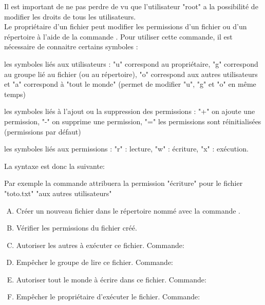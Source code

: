 Il est important de ne pas perdre de vu que l'utilisateur "root" a la possibilité de modifier les droits de tous les utilisateurs.\\

Le propriétaire d'un fichier peut modifier les permissions d'un fichier ou d'un répertoire à l'aide de la commande . Pour utiliser cette commande, il est nécessaire de connaitre certains symboles :

\begin{liste}
	\item les symboles liés aux utilisateurs : "u" correspond au propriétaire, "g" correspond au groupe lié au fichier (ou au répertoire), "o" correspond aux autres utilisateurs et "a" correspond à "tout le monde" (permet de modifier "u", "g" et "o" en même temps)
    \item les symboles liés à l'ajout ou la suppression des permissions : "+" on ajoute une permission, "-" on supprime une permission, "=" les permissions sont réinitialisées (permissions par défaut)
    \item les symboles liés aux permissions : "r" : lecture, "w" : écriture, "x" : exécution.
\end{liste}

\bigskip

La syntaxe est donc la suivante: 

\bigskip

\exemple Par exemple la commande  attribuera la permission "écriture" pour le fichier "toto.txt" "aux autres utilisateurs" 

\newpage


\exer 

\begin{enumerate}[A.]
	\item Créer un nouveau fichier dans le répertoire  nommé  avec la commande .
	\item Vérifier les permissions du fichier créé.
	\item Autoriser les autres à exécuter ce fichier. Commande: \dotfill
	\item Empêcher le groupe de lire ce fichier. Commande: \dotfill
	\item Autoriser tout le monde à écrire dans ce fichier. Commande: \dotfill
	\item Empêcher le propriétaire d'exécuter le fichier. Commande: \dotfill
	
	
\end{enumerate}

